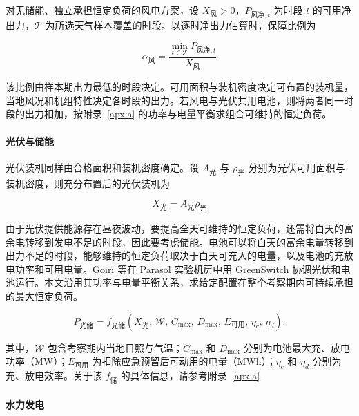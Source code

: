 对无储能、独立承担恒定负荷的风电方案，设 $X_{\text{风}} > 0$，$P_{\text{风净},t}$ 为时段 $t$ 的可用净出力，$\mathcal T$ 为所选天气样本覆盖的时段。以逐时净出力估算时，保障比例为

\begin{equation}\label{eq:q1-alpha}
\alpha_{\text{风}}=\frac{\min_{t\in\mathcal T}P_{\text{风净},t}}{X_{\text{风}}}
\end{equation}

该比例由样本期出力最低的时段决定。可用面积与装机密度决定可布置的装机量，当地风况和机组特性决定各时段的出力\cite{q1ref03}。若风电与光伏共用电池，则将两者同一时段的出力相加，按附录~\ref{apx:a} 的功率与电量平衡求组合可维持的恒定负荷。

\paragraph{光伏与储能}\label{sec:pv}

光伏装机同样由合格面积和装机密度确定。设 $A_{\text{光}}$ 与 $\rho_{\text{光}}$ 分别为光伏可用面积与装机密度，则充分布置后的光伏装机为

\begin{equation}\label{eq:q1-pv}
X_{\text{光}}=A_{\text{光}}\rho_{\text{光}}
\end{equation}

由于光伏提供能源存在昼夜波动，要提高全天可维持的恒定负荷，还需将白天的富余电转移到发电不足的时段，因此要考虑储能。电池可以将白天的富余电量转移到出力不足的时段，能够维持的恒定负荷取决于白天可充入的电量，以及电池的充放电功率和可用电量。Goiri 等在 Parasol 实验机房中用 GreenSwitch 协调光伏和电池运行\cite{q1ref04}。本文沿用其功率与电量平衡关系，求给定配置在整个考察期内可持续承担的最大恒定负荷。

\begin{equation}\label{eq:q1-storage}
P_{\text{光储}}=
f_{\text{光储}}\!\left(X_{\text{光}},\,\mathcal W,\,
C_{\max},\,D_{\max},\,E_{\text{可用}},\,\eta_c,\,\eta_d\right).
\end{equation}

其中，$\mathcal W$ 包含考察期内当地日照与气温；$C_{\max}$ 和 $D_{\max}$ 分别为电池最大充、放电功率（MW）；$E_{\text{可用}}$ 为扣除应急预留后可动用的电量（MWh）；$\eta_c$ 和 $\eta_d$ 分别为充、放电效率。关于该 $f_{\text{储}}$ 的具体信息，请参考附录~\ref{apx:a}

\paragraph{水力发电}\label{sec:hydro}


